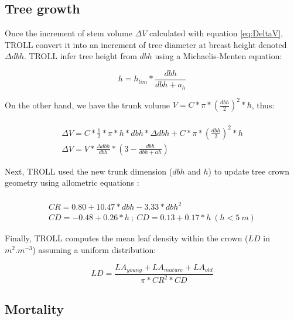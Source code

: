 \documentclass[12pt,]{article}
\theoremstyle{definition}
\theoremstyle{definition}
\theoremstyle{remark}
\begin{document}
\subsection{Tree growth}\label{tree-growth}

Once the increment of stem volume \(\Delta V\) calculated with equation
\eqref{eq:DeltaV}, TROLL convert it into an increment of tree diameter at
breast height denoted \(\Delta dbh\). TROLL infer tree height from
\(dbh\) using a Michaelis-Menten equation:

\begin{equation}
  h = h_{lim}*\frac{dbh}{dbh + a_h}
  \label{eq:h}
\end{equation}

On the other hand, we have the trunk volume
\(V = C * \pi * (\frac{dbh}{2})^2*h\), thus:

\begin{equation}
  \begin{array}{c} \\
    \Delta V = C*\frac{1}{2}*\pi*h*dbh*\Delta dbh + C * \pi * (\frac{dbh}{2})^2*h \\
    \Delta V = V*\frac{\Delta dbh}{dbh}*(3-\frac{dbh}{dbh + ah})
  \end{array}
  \label{eq:Deltadbh}
\end{equation}

Next, TROLL used the new trunk dimension (\(dbh\) and \(h\)) to update
tree crown geometry using allometric equations \citep{Chave2005}:

\begin{equation}
  \begin{array}{c} \\
    CR = 0.80 + 10.47*dbh - 3.33*dbh^2\\
    CD = -0.48 + 0.26*h~;~CD = 0.13 + 0.17*h~(h<5~m)
  \end{array}
  \label{eq:C}
\end{equation}

Finally, TROLL computes the mean leaf density within the crown (\(LD\)
in \(m^2.m^{-3}\)) assuming a uniform distribution:

\begin{equation}
  LD = \frac{LA_{young}+LA_{mature}+LA_{old}}{\pi*CR^2*CD}
  \label{eq:LD}
\end{equation}

\subsection{Mortality}\label{mortality}
\end{document}
